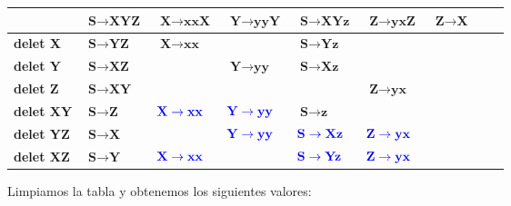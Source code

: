 \begin{table}[H]
	\centering
	\begin{tabular}{|m{2cm}||m{1.8cm}|m{1.8cm}|m{1.8cm}|m{1.8cm}|m{1.8cm}|m{1.8cm}|m{1.8cm}|m{1.8cm}|}
		\hline
		& $ \textbf{S} \rightarrow \textbf{XYZ} $ & $ \textbf{X} \rightarrow \textbf{xxX} $ & $ \textbf{Y} \rightarrow \textbf{yyY} $ & $ \textbf{S} \rightarrow \textbf{XYz} $ & $ \textbf{Z} \rightarrow \textbf{yxZ} $ & $ \textbf{Z} \rightarrow \textbf{X} $ \\
		\hline \hline
		\textbf{delet X} & $ \textbf{S} \rightarrow \textbf{YZ} $ & $ \textbf{X} \rightarrow \textbf{xx} $ &  & $ \textbf{S} \rightarrow \textbf{Yz} $ &  &  \\
		\hline
		\textbf{delet Y} & $ \textbf{S} \rightarrow \textbf{XZ} $ &  & $ \textbf{Y} \rightarrow \textbf{yy} $ & $ \textbf{S} \rightarrow \textbf{Xz} $ &  &  \\
		\hline
		\textbf{delet Z} & $ \textbf{S} \rightarrow \textbf{XY} $ &  &  &  & $ \textbf{Z} \rightarrow \textbf{yx} $ &  \\
		\hline
		\textbf{delet XY} & $ \textbf{S} \rightarrow \textbf{Z} $ & $ \textcolor{blue}{ \textbf{X} \rightarrow \textbf{xx} } $ & $ \textcolor{blue}{ \textbf{Y} \rightarrow \textbf{yy} } $ & $ \textbf{S} \rightarrow \textbf{z} $ &  &  \\
		\hline
		\textbf{delet YZ} & $ \textbf{S} \rightarrow \textbf{X} $ &  & $ \textcolor{blue}{ \textbf{Y} \rightarrow \textbf{yy} } $ & $ \textcolor{blue}{ \textbf{S} \rightarrow \textbf{Xz} } $ & $ \textcolor{blue}{ \textbf{Z} \rightarrow \textbf{yx} } $ &  \\
		\hline
		\textbf{delet XZ} & $ \textbf{S} \rightarrow \textbf{Y} $ & $ \textcolor{blue}{ \textbf{X} \rightarrow \textbf{xx} } $ &  & $ \textcolor{blue}{ \textbf{S} \rightarrow \textbf{Yz} } $ & $ \textcolor{blue}{ \textbf{Z} \rightarrow \textbf{yx} } $ &  \\
		\hline
	\end{tabular}
	\label{fig:tabla-prac-4B}
\end{table}

Limpiamos la tabla y obtenemos los siguientes valores: 

